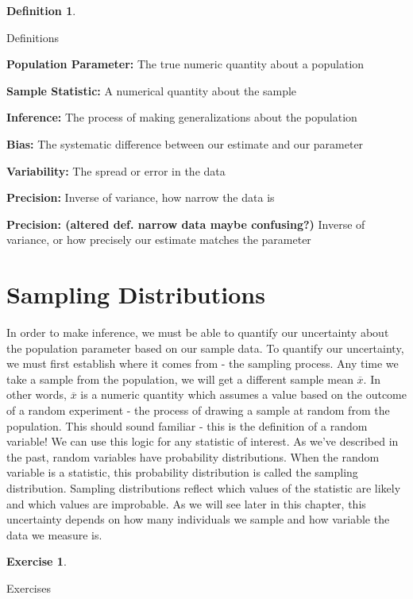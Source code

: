 \documentclass[
]{book}
\theoremstyle{definition}
\newtheorem{definition}{Definition}[chapter]
\theoremstyle{definition}
\theoremstyle{definition}
\newtheorem{exercise}{Exercise}[chapter]
\theoremstyle{remark}
\begin{document}
\begin{definition}
\protect\hypertarget{def:unlabeled-div-3}{}\label{def:unlabeled-div-3}

Definitions

\end{definition}

\textbf{Population Parameter: } The true numeric quantity about a population

\textbf{Sample Statistic: } A numerical quantity about the sample

\textbf{Inference: } The process of making generalizations about the population

\textbf{Bias: } The systematic difference between our estimate and our parameter

\textbf{Variability: } The spread or error in the data

\textbf{Precision: } Inverse of variance, how narrow the data is

\textbf{Precision: (altered def. narrow data maybe confusing?) } Inverse of variance, or how precisely our estimate matches the parameter

\hypertarget{sampling-distributions}{%
\section{Sampling Distributions}\label{sampling-distributions}}

In order to make inference, we must be able to quantify our uncertainty about the population parameter based on our sample data. To quantify our uncertainty, we must first establish where it comes from - the sampling process. Any time we take a sample from the population, we will get a different sample mean \(\overline{x}\). In other words, \(\overline{x}\) is a numeric quantity which assumes a value based on the outcome of a random experiment - the process of drawing a sample at random from the population. This should sound familiar - this is the definition of a random variable! We can use this logic for any statistic of interest. As we've described in the past, random variables have probability distributions. When the random variable is a statistic, this probability distribution is called the sampling distribution. Sampling distributions reflect which values of the statistic are likely and which values are improbable. As we will see later in this chapter, this uncertainty depends on how many individuals we sample and how variable the data we measure is.

\begin{exercise}
\protect\hypertarget{exr:unlabeled-div-4}{}\label{exr:unlabeled-div-4}

Exercises

\end{exercise}
\end{document}
